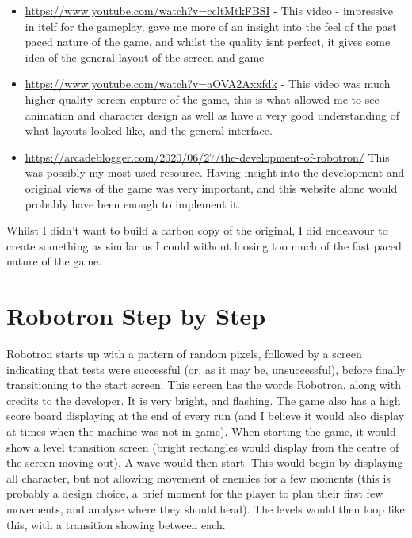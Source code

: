 \begin{itemize}
    \item \url{https://www.youtube.com/watch?v=ccltMtkFBSI} - This video - impressive in itelf for the gameplay, gave me more of an insight into the feel of the past paced nature of the game, and whilst the quality isnt perfect, it gives some idea of the general layout of the screen and game
    
    \item \url{https://www.youtube.com/watch?v=aOVA2Axxfdk} - This video was much higher quality screen capture of the game, this is what allowed me to see animation and character design as well as have a very good understanding of what layouts looked like, and the general interface.
    
    \item \url{https://arcadeblogger.com/2020/06/27/the-development-of-robotron/} This was possibly my most used resource. Having insight into the development and original views of the game was very important, and this website alone would probably have been enough to implement it. 
\end{itemize}

Whilst I didn't want to build a carbon copy of the original, I did endeavour to create something as similar as I could without loosing too much of the fast paced nature of the game.


\section{Robotron Step by Step}
Robotron starts up with a pattern of random pixels, followed by a screen indicating that tests were successful (or, as it may be, unsuccessful), before finally transitioning to the start screen. This screen has the words Robotron, along with credits to the developer. It is very bright, and flashing. The game also has a high score board displaying at the end of every run (and I believe it would also display at times when the machine was not in game). When starting the game, it would show a level transition screen (bright rectangles would display from the centre of the screen moving out). A wave would then start. This would begin by displaying all character, but not allowing movement of enemies for a few moments (this is probably a design choice, a brief moment for the player to plan their first few movements, and analyse where they should head). The levels would then loop like this, with a transition showing between each.

